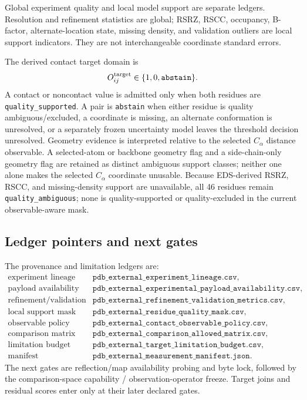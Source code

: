 Global experiment quality and local model support are separate ledgers.
Resolution and refinement statistics are global; RSRZ, RSCC, occupancy,
B-factor, alternate-location state, missing density, and validation outliers are
local support indicators.  They are not interchangeable coordinate standard
errors.

The derived contact target domain is
\[
O^{\rm target}_{ij}\in\{1,0,\texttt{abstain}\}.
\]
A contact or noncontact value is admitted only when both residues are
\texttt{quality\_supported}.  A pair is \texttt{abstain} when either residue is
quality ambiguous/excluded, a coordinate is missing, an alternate conformation
is unresolved, or a separately frozen uncertainty model leaves the threshold
decision unresolved.  Geometry evidence is interpreted relative to the selected
$C_\alpha$ distance observable.  A selected-atom or backbone geometry flag and
a side-chain-only geometry flag are retained as distinct ambiguous support
classes; neither one alone makes the selected $C_\alpha$ coordinate unusable.
Because EDS-derived RSRZ, RSCC, and missing-density support are unavailable, all
46 residues remain \texttt{quality\_ambiguous}; none is quality-supported or
quality-excluded in the current observable-aware mask.

\subsection{Ledger pointers and next gates}

The provenance and limitation ledgers are:
\[
\begin{array}{ll}
\text{experiment lineage} & \texttt{pdb\_external\_experiment\_lineage.csv},\\
\text{payload availability} & \texttt{pdb\_external\_experimental\_payload\_availability.csv},\\
\text{refinement/validation} & \texttt{pdb\_external\_refinement\_validation\_metrics.csv},\\
\text{local support mask} & \texttt{pdb\_external\_residue\_quality\_mask.csv},\\
\text{observable policy} & \texttt{pdb\_external\_contact\_observable\_policy.csv},\\
\text{comparison matrix} & \texttt{pdb\_external\_comparison\_allowed\_matrix.csv},\\
\text{limitation budget} & \texttt{pdb\_external\_target\_limitation\_budget.csv},\\
\text{manifest} & \texttt{pdb\_external\_measurement\_manifest.json}.
\end{array}
\]
The next gates are reflection/map availability probing and byte lock, followed
by the comparison-space capability / observation-operator freeze.  Target joins
and residual scores enter only at their later declared gates.
